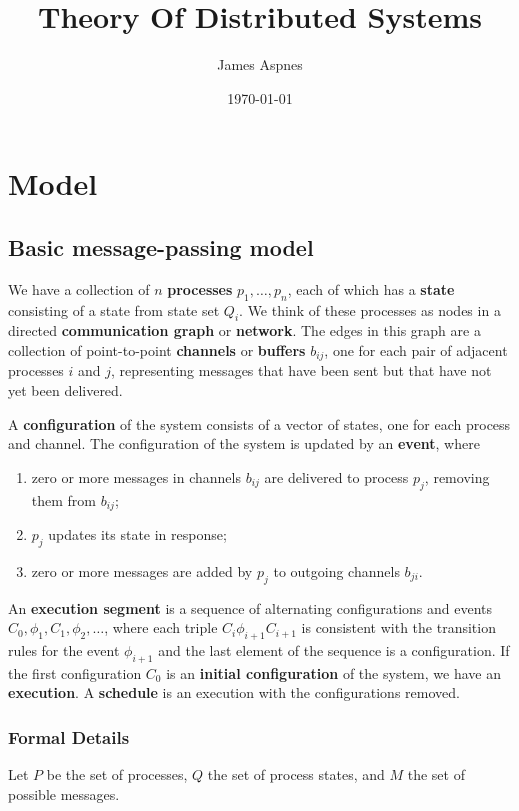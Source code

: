 \documentclass[11pt]{article}
\author{James Aspnes}
\date{\today}
\title{Theory Of Distributed Systems}
\begin{document}
\maketitle
\tableofcontents

\section{Model}
\label{sec:orge54c942}
\subsection{Basic message-passing model}
\label{sec:orgacc630c}
We have a collection of \(n\) \textbf{processes} \(p_1,\dots,p_n\), each of which has a \textbf{state} consisting of a state
from state set \(Q_i\). We think of these processes as nodes in a directed \textbf{communication graph} or
\textbf{network}. The edges in this graph are a collection of point-to-point \textbf{channels} or \textbf{buffers} \(b_{ij}\),
one for each pair of adjacent processes \(i\) and \(j\), representing messages that have been sent but
that have not yet been delivered.

A \textbf{configuration} of the system consists of a vector of states, one for each process and channel. The
configuration of the system is updated by an \textbf{event}, where
\begin{enumerate}
\item zero or more messages in channels \(b_{ij}\) are delivered to process \(p_j\), removing them from
\(b_{ij}\);
\item \(p_j\) updates its state in response;
\item zero or more messages are added by \(p_j\) to outgoing channels \(b_{ji}\).
\end{enumerate}

An \textbf{execution segment} is a sequence of alternating configurations and events \(C_0,\phi_1,C_1,\phi_2,\dots\), where
each triple \(C_i\phi_{i+1}C_{i+1}\) is consistent with the transition rules for the event \(\phi_{i+1}\) and
the last element of the sequence is a configuration. If the first configuration \(C_0\) is an \textbf{initial
configuration} of the system, we have an \textbf{execution}. A \textbf{schedule} is an execution with the configurations
removed.
\subsubsection{Formal Details}
\label{sec:orgcaf0076}
Let \(P\) be the set of processes, \(Q\) the set of process states, and \(M\) the set of possible
messages.
\end{document}
